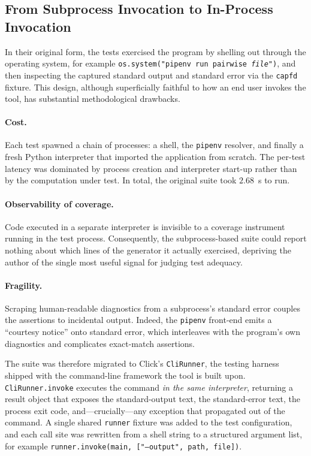 \documentclass[
  digital, %
  oneside, %
  lof,     %
  nolot,     %
]{fithesis4}
\begin{document}
\subsection{From Subprocess Invocation to In-Process Invocation}
\label{sec:tsi-clirunner}

In their original form, the tests exercised the program by shelling out through
the operating system, for example
\texttt{os.system("pipenv run pairwise \textit{file}")}, and then inspecting the
captured standard output and standard error via the \texttt{capfd} fixture. This
design, although superficially faithful to how an end user invokes the tool, has
substantial methodological drawbacks.

\paragraph{Cost.} Each test spawned a chain of processes: a shell, the
\texttt{pipenv} resolver, and finally a fresh Python interpreter that imported
the application from scratch. The per-test latency was dominated by process
creation and interpreter start-up rather than by the computation under test. In total, the
original suite took $2.68$~s to run.

\paragraph{Observability of coverage.} Code executed in a separate interpreter
is invisible to a coverage instrument running in the test process. Consequently,
the subprocess-based suite could report nothing about which lines of the
generator it actually exercised, depriving the author of the single most useful
signal for judging test adequacy.

\paragraph{Fragility.} Scraping human-readable diagnostics from a subprocess's
standard error couples the assertions to incidental output. Indeed, the
\texttt{pipenv} front-end emits a ``courtesy notice'' onto standard error, which
interleaves with the program's own diagnostics and complicates exact-match
assertions.

The suite was therefore migrated to Click's \texttt{CliRunner}, the testing
harness shipped with the command-line framework the tool is built upon.
\texttt{CliRunner.invoke} executes the command \emph{in the same interpreter},
returning a result object that exposes the standard-output text, the
standard-error text, the process exit code, and---crucially---any exception that
propagated out of the command. A single shared \texttt{runner} fixture was added
to the test configuration, and each call site was rewritten from a shell string
to a structured argument list, for example
\texttt{runner.invoke(main, ["--output", path, file])}.
\end{document}
